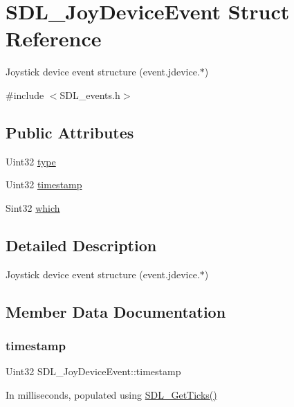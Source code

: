 \hypertarget{struct_s_d_l___joy_device_event}{}\section{S\+D\+L\+\_\+\+Joy\+Device\+Event Struct Reference}
\label{struct_s_d_l___joy_device_event}


Joystick device event structure (event.\+jdevice.$\ast$)  




{\ttfamily \#include $<$S\+D\+L\+\_\+events.\+h$>$}

\subsection*{Public Attributes}
\begin{DoxyCompactItemize}
\item 
Uint32 \mbox{\hyperlink{struct_s_d_l___joy_device_event_a51f060ba1dd5669b458e9c97aece667e}{type}}
\item 
Uint32 \mbox{\hyperlink{struct_s_d_l___joy_device_event_a5c4a9271bfff5d5c2e09a0dc732df8f3}{timestamp}}
\item 
Sint32 \mbox{\hyperlink{struct_s_d_l___joy_device_event_af9b295798f033b799ebbda7de6cb5a7e}{which}}
\end{DoxyCompactItemize}


\subsection{Detailed Description}
Joystick device event structure (event.\+jdevice.$\ast$) 

\subsection{Member Data Documentation}
\mbox{\label{struct_s_d_l___joy_device_event_a5c4a9271bfff5d5c2e09a0dc732df8f3}} 
\subsubsection{\texorpdfstring{timestamp}{timestamp}}
{\footnotesize\ttfamily Uint32 S\+D\+L\+\_\+\+Joy\+Device\+Event\+::timestamp}

In milliseconds, populated using \mbox{\hyperlink{_s_d_l__timer_8h_a0b9bc71d6287e0ffafdc3419760fe2b3}{S\+D\+L\+\_\+\+Get\+Ticks()}} \mbox{\label{struct_s_d_l___joy_device_event_a51f060ba1dd5669b458e9c97aece667e}} 
